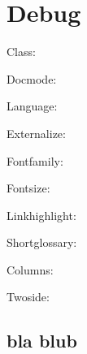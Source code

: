 \section*{Debug}
\label{cha:debug}
Class: \eesDebugClass

Docmode:	\eesDebugDocmode

Language: \eesDebugLanguage

Externalize: \eesDebugExternalize

Fontfamily: \eesDebugFontfamily

Fontsize: \eesDebugFontsize

Linkhighlight: \eesDebugLinkhighlight

Shortglossary: \eesDebugShortglossary

Columns: \eesDebugTwocolumn

Twoside: \eesDebugTwoside



\subsection{bla blub}
\blindtext[2]